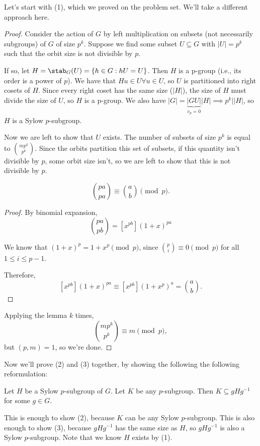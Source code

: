 Let's start with (1), which we proved on the problem set. We'll take a different approach here.
\begin{proof}
Consider the action of $G$ by left multiplication on subsets (not necessarily subgroups) of $G$ of size $p^k$. Suppose we find some subset $U\subseteq G$ with $\vert U\vert = p^k$ such that the orbit size is not divisible by $p$.  

If so, let $H = \stab_{G}(U) = \{h\in G: hU = U\}$. Then $H$ is a p-group (i.e., its order is a power of $p$). We have that $Hu\in U\forall u\in U$, so $U$ is partitioned into right cosets of $H$. Since every right coset has the same size ($\vert H\vert$), the size of $H$ must divide the size of $U$, so $H$ is a p-group. 
We also have $\vert G\vert = \underbrace{\vert GU\vert}_{v_p=0} \vert H\vert\implies p^k\mid \vert H\vert$, so $H$ is a Sylow $p$-subgroup. 

Now we are left to show that $U$ exists. The number of subsets of size $p^k$ is equal to $\binom{mp^k}{p^k}$. Since the orbits partition this set of subsets, if this quantity isn't divisible by $p$, some orbit size isn't, so we are left to show that this is not divisible by $p$.

\begin{theorem}
\lemlabel

\[\binom{pa}{pa}\equiv \binom{a}{b}\pmod{p}.\]
\end{theorem}

\begin{proof}
By binomial expansion, 
\[\binom{pa}{pb} = [x^{pb}] (1+x)^{pa}\]

We know that $(1+x)^p = 1+x^p\pmod{p}$, since $\binom{p}{i}\equiv 0\pmod{p}$ for all $1\leq i\leq p-1$. 

Therefore, 
\[[x^{pb}] (1+x)^{pa} \equiv [x^{pb}] (1+x^p)^a = \binom{a}{b}.\]
\end{proof}

Applying the lemma $k$ times, 
\[\binom{mp^k}{p^k}\equiv m\pmod{p},\]
but $(p,m)=1$, so we're done.
\end{proof}

Now we'll prove (2) and (3) together, by showing the following the following reformulation:
\begin{theorem}
\lemlabel 

Let $H$ be a Sylow $p$-subgroup of $G$. Let $K$ be any $p$-subgroup. Then $K\subseteq gHg^{-1}$ for some $g\in G$.  
\end{theorem}

This is enough to show (2), because $K$ can be any Sylow $p$-subgroup. This is also enough to show (3), because $gHg^{-1}$ has the same size as $H$, so $gHg^{-1}$ is also a Sylow $p$-subgroup. Note that we know $H$ exists by (1). 

